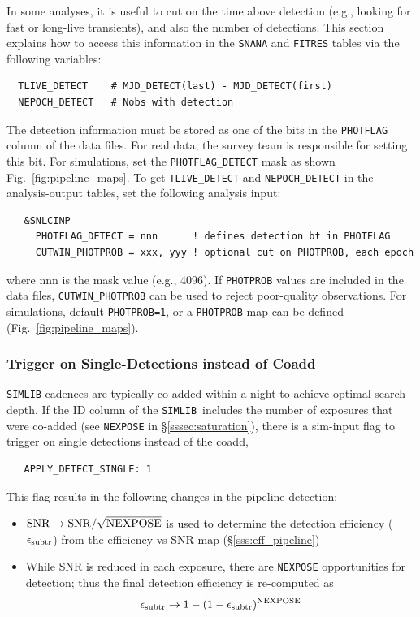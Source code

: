 \documentclass[12pt]{article}
\newcommand{\simlib}{{\tt SIMLIB}}
\newcommand{\simeffsub}{\epsilon_{\rm subtr}}
\begin{document}
{In some analyses, it is useful to cut on the time above detection
(e.g., looking for fast or long-live transients), and also the
number of detections. This section explains how to access this
information in the {\tt SNANA} and {\tt FITRES} tables via
the following variables:
%
\begin{verbatim}
  TLIVE_DETECT    # MJD_DETECT(last) - MJD_DETECT(first)
  NEPOCH_DETECT   # Nobs with detection
\end{verbatim}
%
The detection information must be stored as one of the bits in the
{\tt PHOTFLAG} column of the data files. For real data, the survey
team is responsible for setting this bit. For simulations, set the
{\tt PHOTFLAG\_DETECT} mask as shown Fig.~\ref{fig:pipeline_maps}.
To get {\tt TLIVE\_DETECT} and {\tt NEPOCH\_DETECT} in the
analysis-output tables, set the following analysis input:
\begin{verbatim}                                                               
   &SNLCINP
     PHOTFLAG_DETECT = nnn      ! defines detection bt in PHOTFLAG
     CUTWIN_PHOTPROB = xxx, yyy ! optional cut on PHOTPROB, each epoch
\end{verbatim}                                                                
%
where nnn is the mask value (e.g., 4096).
If {\tt PHOTPROB} values are included in the data files,
{\tt CUTWIN\_PHOTPROB} can be used to reject poor-quality 
observations. For simulations, default {\tt PHOTPROB=1},
or a {\tt PHOTPROB} map can be defined (Fig.~\ref{fig:pipeline_maps}).

   \subsubsection{Trigger on Single-Detections instead of Coadd}
   \label{sssec:detect_single}

{\simlib} cadences are typically co-added within a night to achieve
optimal search depth. If the ID column of the \simlib\ includes
the number of exposures that were co-added 
(see {\tt NEXPOSE} in \S\ref{sssec:saturation}),
there is a sim-input flag to trigger on single detections instead
of the coadd,
\begin{verbatim}
   APPLY_DETECT_SINGLE: 1
\end{verbatim}
This flag results in the following changes in the pipeline-detection:
\begin{itemize}
   \item ${\rm SNR} \to {\rm SNR}/\sqrt{\rm NEXPOSE}$ is used to
      determine the detection efficiency ($\simeffsub$) 
      from the efficiency-vs-SNR map
      (\S\ref{sss:eff_pipeline})
   \item While SNR is reduced in each exposure, there are {\tt NEXPOSE}
      opportunities for detection; thus the final detection efficiency
      is re-computed as
  \begin{equation}
     \simeffsub \to 1 - (1-\simeffsub)^{\rm NEXPOSE}
  \end{equation}
\end{itemize}

}
\end{document}
